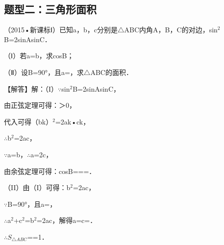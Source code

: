 \subsection{题型二：三角形面积}

\begin{question}
（2015•新课标Ⅰ）已知a，b，c分别是$\triangle$ABC内角A，B，C的对边，sin$^{2}$B=2sinAsinC．\par
（Ⅰ）若a=b，求cosB；\par
（Ⅱ）设B=90°，且a=\allowbreak{}，求$\triangle$ABC的面积．\par
\begin{solution}
【解答】解：（I）$\because$sin$^{2}$B=2sinAsinC，\par
由正弦定理可得：\allowbreak{}＞0，\par
代入可得（bk）$^{2}$=2ak•ck，\par
$\therefore$b$^{2}$=2ac，\par
$\because$a=b，$\therefore$a=2c，\par
由余弦定理可得：cosB=\allowbreak{}=\allowbreak{}=\allowbreak{}．\par
（II）由（I）可得：b$^{2}$=2ac，\par
$\because$B=90°，且a=\allowbreak{}，\par
$\therefore$a$^{2}$+c$^{2}$=b$^{2}$=2ac，解得a=c=\allowbreak{}．\par
$\therefore$$S_{\triangle ABC}$=\allowbreak{}=1．\par
\end{solution}
\end{question}

